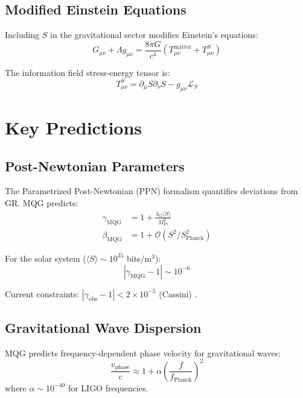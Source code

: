 \documentclass[twocolumn,prd,superscriptaddress,nofootinbib]{revtex4-2}
\newcommand{\sfield}{S}
\newcommand{\splanck}{S_{\text{Planck}}}
\begin{document}
\subsection{Modified Einstein Equations}

Including $\sfield$ in the gravitational sector modifies Einstein's equations:
\begin{equation}
G_{\mu\nu} + \Lambda g_{\mu\nu} = \frac{8\pi G}{c^4} \left(T_{\mu\nu}^{\text{matter}} + T_{\mu\nu}^{\sfield}\right)
\end{equation}

The information field stress-energy tensor is:
\begin{equation}
T_{\mu\nu}^{\sfield} = \partial_\mu \sfield \partial_\nu \sfield - g_{\mu\nu} \mathcal{L}_{\sfield}
\end{equation}

\section{Key Predictions}

\subsection{Post-Newtonian Parameters}

The Parametrized Post-Newtonian (PPN) formalism quantifies deviations from GR. MQG predicts:
\begin{align}
\gamma_{\text{MQG}} &= 1 + \frac{\lambda_G \langle \sfield \rangle}{M_{\text{Pl}}^2} \\
\beta_{\text{MQG}} &= 1 + \mathcal{O}(\sfield^2/\splanck^2)
\end{align}

For the solar system ($\langle \sfield \rangle \sim 10^{35}$ bits/m$^3$):
\begin{equation}
|\gamma_{\text{MQG}} - 1| \sim 10^{-6}
\end{equation}

Current constraints: $|\gamma_{\text{obs}} - 1| < 2 \times 10^{-5}$ (Cassini) \cite{Bertotti2003}.

\subsection{Gravitational Wave Dispersion}

MQG predicts frequency-dependent phase velocity for gravitational waves:
\begin{equation}
\frac{v_{\text{phase}}}{c} \approx 1 + \alpha \left(\frac{f}{f_{\text{Planck}}}\right)^2
\end{equation}
where $\alpha \sim 10^{-40}$ for LIGO frequencies.
\end{document}
